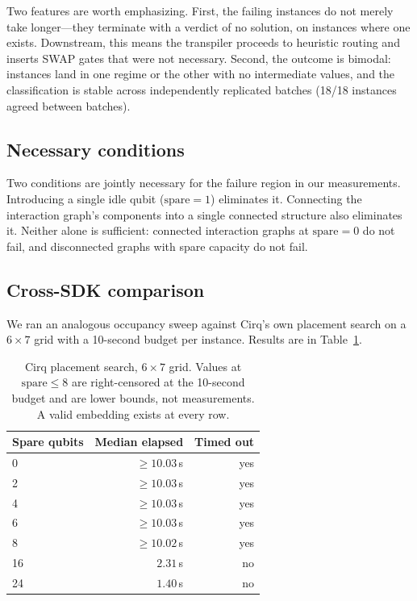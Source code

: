 \documentclass[11pt]{article}
\begin{document}
Two features are worth emphasizing. First, the failing instances do not
merely take longer---they terminate with a verdict of no solution, on
instances where one exists. Downstream, this means the transpiler
proceeds to heuristic routing and inserts SWAP gates that were not
necessary. Second, the outcome is bimodal: instances land in one regime
or the other with no intermediate values, and the classification is
stable across independently replicated batches (18/18 instances agreed
between batches).

\subsection{Necessary conditions}

Two conditions are jointly necessary for the failure region in our
measurements. Introducing a single idle qubit ($\mathrm{spare}=1$)
eliminates it. Connecting the interaction graph's components into a
single connected structure also eliminates it. Neither alone is
sufficient: connected interaction graphs at $\mathrm{spare}=0$ do not
fail, and disconnected graphs with spare capacity do not fail.

\subsection{Cross-SDK comparison}

We ran an analogous occupancy sweep against Cirq's own placement search
on a $6\times7$ grid with a 10-second budget per instance. Results are
in Table~\ref{tab:cirq}.

\begin{table}[h]
\centering
\begin{tabular}{lrr}
\toprule
Spare qubits & Median elapsed & Timed out \\
\midrule
0 & $\geq 10.03$\,s & yes \\
2 & $\geq 10.03$\,s & yes \\
4 & $\geq 10.03$\,s & yes \\
6 & $\geq 10.03$\,s & yes \\
8 & $\geq 10.02$\,s & yes \\
16 & $2.31$\,s & no \\
24 & $1.40$\,s & no \\
\bottomrule
\end{tabular}
\caption{Cirq placement search, $6\times7$ grid. Values at
$\mathrm{spare} \leq 8$ are right-censored at the 10-second budget and
are lower bounds, not measurements. A valid embedding exists at every
row.}
\label{tab:cirq}
\end{table}
\end{document}
